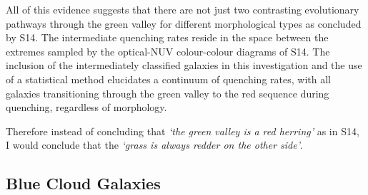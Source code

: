 All of this evidence suggests that there are not just two contrasting evolutionary pathways through the green valley for different morphological types as concluded by S14. The intermediate quenching rates reside in the space between the extremes sampled by the optical-NUV colour-colour diagrams of S14. The inclusion of the intermediately classified galaxies in this investigation and the use of a statistical method elucidates a continuum of quenching rates, with all galaxies transitioning through the green valley to the red sequence during quenching, regardless of morphology. 

Therefore instead of concluding that \emph{`the green valley is a red herring'} as in S14, I would conclude that the \emph{`grass is always redder on the other side'}.


\subsection{Blue Cloud Galaxies}\label{bc}

